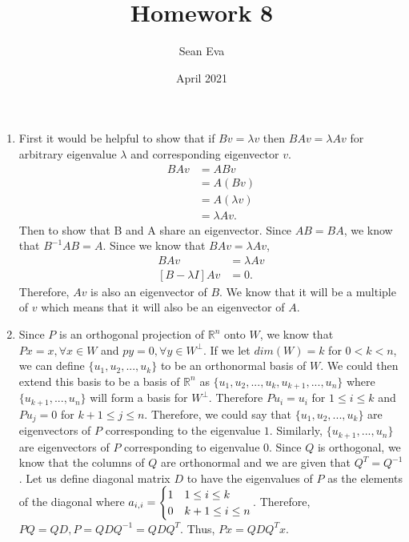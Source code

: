 \documentclass{article}
\title{Homework 8}
\author{Sean Eva}
\date{April 2021}
\begin{document}
\maketitle

\begin{enumerate}
    \item 
    
    First it would be helpful to show that if $Bv=\lambda v$ then $BAv=\lambda Av$ for arbitrary eigenvalue $\lambda$ and corresponding eigenvector $v$.
    \begin{align*}
        BAv&=ABv\\
        &=A(Bv)\\
        &=A(\lambda v)\\
        &=\lambda Av.
    \end{align*} Then to show that B and A share an eigenvector. Since $AB=BA$, we know that $B^{-1}AB=A.$ Since we know that $BAv=\lambda Av$,
    \begin{align*}
        BAv&=\lambda Av\\
        [B-\lambda I]Av&=0.
    \end{align*} Therefore, $Av$ is also an eigenvector of $B$. We know that it will be a multiple of $v$ which means that it will also be an eigenvector of $A$.
    
    \item
    
    Since $P$ is an orthogonal projection of $\mathbb{R}^n$ onto $W$, we know that $Px=x, \forall x\in W$ and $py=0,\forall y\in W^\perp$. If we let $dim(W)=k$ for $0<k<n$, we can define $\{u_1, u_2, ..., u_k\}$ to be an orthonormal basis of $W$. We could then extend this basis to be a basis of $\mathbb{R}^n$ as $\{u_1, u_2,..., u_k, u_{k+1}, ..., u_n\}$ where $\{u_{k+1}, ..., u_n\}$ will form a basis for $W^\perp$. Therefore $Pu_i=u_i$ for $1\leq i\leq k$ and $Pu_j=0$ for $k+1\leq j\leq n$. Therefore, we could say that $\{u_1, u_2, ..., u_k\}$ are eigenvectors of $P$ corresponding to the eigenvalue $1$. Similarly, $\{u_{k+1}, ..., u_n\}$ are eigenvectors of $P$ corresponding to eigenvalue $0$. Since $Q$ is orthogonal, we know that the columns of $Q$ are orthonormal and we are given that $Q^T=Q^{-1}$. Let us define diagonal matrix $D$ to have the eigenvalues of $P$ as the elements of the diagonal where $a_{i,i}=\begin{cases}
    1 & 1\leq i\leq k\crcr
    0 & k+1\leq i\leq n
    \end{cases}$. Therefore, $PQ=QD, P=QDQ^{-1}=QDQ^T$. Thus, $Px=QDQ^Tx$.
    

\end{enumerate}
\end{document}
